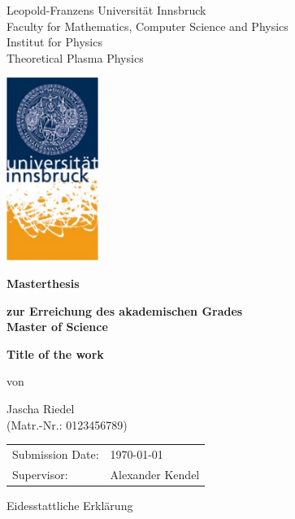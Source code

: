 \documentclass[12pt,oneside,bibtotoc,liststotoc]{scrbook}
\begin{document}
\thispagestyle{empty}
\begin{center}
\LARGE{Leopold-Franzens Universität Innsbruck\\
Faculty for Mathematics, Computer Science and Physics}\\[3ex]
\large{Institut for Physics}\\[2ex]
\large{Theoretical Plasma Physics}
\end{center}
\medskip

\begin{center}
\includegraphics[width=3cm]{Logo}
\vspace{1.5cm}

\textbf{\LARGE{Masterthesis}}
\medskip\par
\textbf{\normalsize{zur Erreichung des akademischen Grades}} \\[3ex]
\textbf{\Large{Master of Science}}
\vspace{2cm}

\textbf{\Large{Title of the work}}
\bigskip\par
von \par
\large{Jascha Riedel}\\
(Matr.-Nr.: 0123456789)
\end{center}
\vspace{1cm}

\begin{tabular}{ll}
  Submission Date:  & \today \\
  Supervisor: & Alexander Kendel \\
\end{tabular}

\newpage

\vspace*{5cm}

\begin{center}
\LARGE{Eidesstattliche Erklärung}\\
\end{center}
\vspace{1cm}
\end{document}
